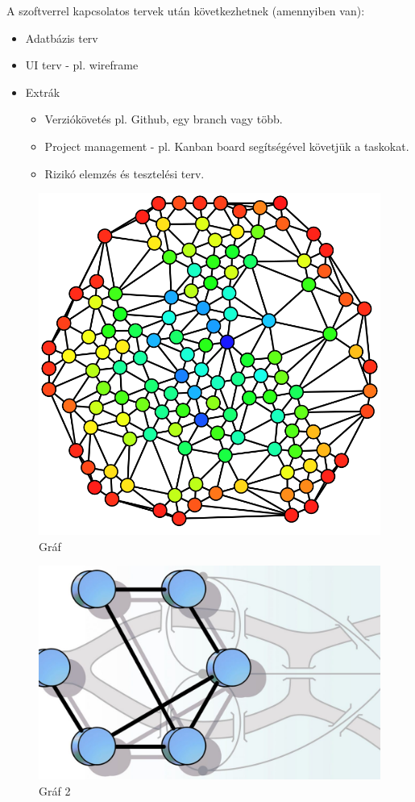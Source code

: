 A szoftverrel kapcsolatos tervek után következhetnek (amennyiben van):
\begin{itemize}
\item Adatbázis terv
\item UI terv - pl. wireframe 
\item Extrák
			\begin{itemize}
			\item Verziókövetés pl. Github, egy branch vagy több. 
			\item Project management - pl. Kanban board segítségével követjük a taskokat.
			\item Rizikó elemzés és tesztelési terv.
		\end{itemize}
\end{itemize}
\begin{figure}[!h]
	\centering
	\includegraphics[scale=0.2]{images/graf1}
	\caption{Gr\'af}
\end{figure}


\begin{figure}[!h]
	\centering
	\includegraphics[scale=0.2]{images/graf2}
	\caption{Gr\'af 2}
\end{figure}


